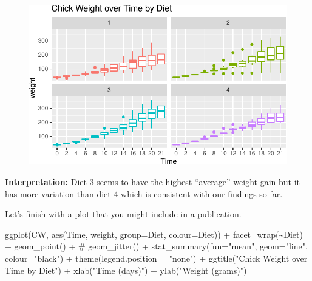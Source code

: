 \documentclass[
  letterpaper,
  DIV=11,
  numbers=noendperiod]{scrreprt}
\newenvironment{Shaded}{\begin{snugshade}}{\end{snugshade}}
\newcommand{\AttributeTok}[1]{\textcolor[rgb]{0.40,0.45,0.13}{#1}}
\newcommand{\CommentTok}[1]{\textcolor[rgb]{0.37,0.37,0.37}{#1}}
\newcommand{\FunctionTok}[1]{\textcolor[rgb]{0.28,0.35,0.67}{#1}}
\newcommand{\NormalTok}[1]{\textcolor[rgb]{0.00,0.23,0.31}{#1}}
\newcommand{\SpecialCharTok}[1]{\textcolor[rgb]{0.37,0.37,0.37}{#1}}
\newcommand{\StringTok}[1]{\textcolor[rgb]{0.13,0.47,0.30}{#1}}
\theoremstyle{definition}
\theoremstyle{plain}
\theoremstyle{plain}
\theoremstyle{remark}
\begin{document}
\begin{figure}[H]

{\centering \includegraphics{./01-Introduction-to-R_files/figure-pdf/boxPlot-1.pdf}

}

\end{figure}

\textbf{Interpretation:} Diet 3 seems to have the highest ``average''
weight gain but it has more variation than diet 4 which is consistent
with our findings so far.

Let's finish with a plot that you might include in a publication.

\begin{Shaded}
\begin{Highlighting}[]
\FunctionTok{ggplot}\NormalTok{(CW, }\FunctionTok{aes}\NormalTok{(Time, weight, }\AttributeTok{group=}\NormalTok{Diet, }
                             \AttributeTok{colour=}\NormalTok{Diet)) }\SpecialCharTok{+}
  \FunctionTok{facet\_wrap}\NormalTok{(}\SpecialCharTok{\textasciitilde{}}\NormalTok{Diet) }\SpecialCharTok{+}
  \FunctionTok{geom\_point}\NormalTok{() }\SpecialCharTok{+}
  \CommentTok{\# geom\_jitter() +}
  \FunctionTok{stat\_summary}\NormalTok{(}\AttributeTok{fun=}\StringTok{"mean"}\NormalTok{, }\AttributeTok{geom=}\StringTok{"line"}\NormalTok{,}
               \AttributeTok{colour=}\StringTok{"black"}\NormalTok{) }\SpecialCharTok{+}
  \FunctionTok{theme}\NormalTok{(}\AttributeTok{legend.position =} \StringTok{"none"}\NormalTok{) }\SpecialCharTok{+}
  \FunctionTok{ggtitle}\NormalTok{(}\StringTok{"Chick Weight over Time by Diet"}\NormalTok{) }\SpecialCharTok{+} 
  \FunctionTok{xlab}\NormalTok{(}\StringTok{"Time (days)"}\NormalTok{) }\SpecialCharTok{+}
  \FunctionTok{ylab}\NormalTok{(}\StringTok{"Weight (grams)"}\NormalTok{)}
\end{Highlighting}
\end{Shaded}
\end{document}
